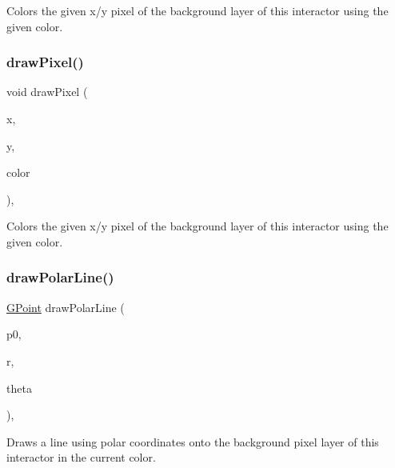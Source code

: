 Colors the given x/y pixel of the background layer of this interactor using the given color. 

\mbox{\label{classGDrawingSurface_a20abc26a94b7eb310e34abf668e0f5f4}} 
\subsubsection{\texorpdfstring{draw\+Pixel()}{drawPixel()}\hspace{0.1cm}{\footnotesize\ttfamily [3/3]}}
{\footnotesize\ttfamily void draw\+Pixel (\begin{DoxyParamCaption}\item[{double}]{x,  }\item[{double}]{y,  }\item[{const std\+::string \&}]{color }\end{DoxyParamCaption})\hspace{0.3cm}{\ttfamily [virtual]}, {\ttfamily [inherited]}}



Colors the given x/y pixel of the background layer of this interactor using the given color. 

\mbox{\label{classGDrawingSurface_af70cce1e4f708f1ed5b6f29cecb660e7}} 
\subsubsection{\texorpdfstring{draw\+Polar\+Line()}{drawPolarLine()}\hspace{0.1cm}{\footnotesize\ttfamily [1/2]}}
{\footnotesize\ttfamily \mbox{\hyperlink{structGPoint}{G\+Point}} draw\+Polar\+Line (\begin{DoxyParamCaption}\item[{const \mbox{\hyperlink{structGPoint}{G\+Point}} \&}]{p0,  }\item[{double}]{r,  }\item[{double}]{theta }\end{DoxyParamCaption})\hspace{0.3cm}{\ttfamily [virtual]}, {\ttfamily [inherited]}}



Draws a line using polar coordinates onto the background pixel layer of this interactor in the current color. 

